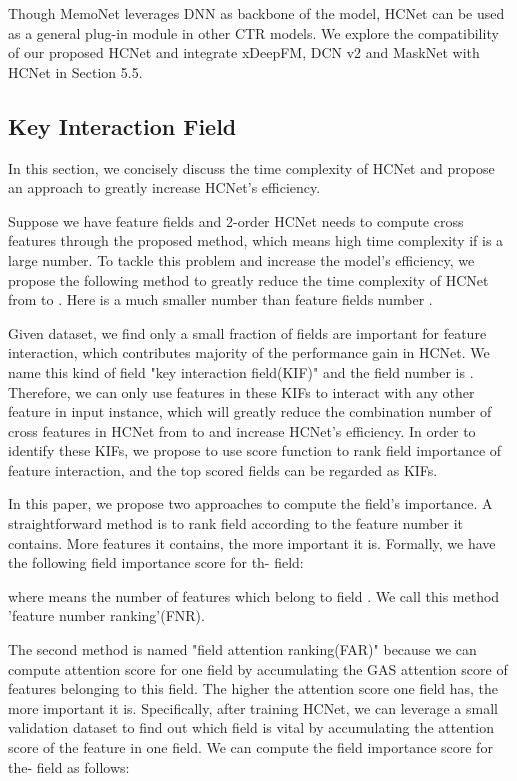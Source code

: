 \documentclass[sigconf,authorversion]{acmart}
\begin{document}
Though MemoNet leverages DNN as backbone of the model, HCNet can be used as a general plug-in module in other CTR models. We explore the compatibility of our proposed HCNet and integrate xDeepFM, DCN v2 and MaskNet with HCNet in Section 5.5.  

\subsection{Key Interaction Field}
In this section, we concisely discuss the time complexity of HCNet and propose an approach to greatly increase HCNet's efficiency.

Suppose we have  feature fields and 2-order HCNet needs to compute  cross features through the proposed method, which means high time complexity if  is a large number. To tackle this problem and increase the model's efficiency, we propose the following method to greatly reduce the time complexity of HCNet from  to . Here   is a much smaller number than feature fields number .  

Given dataset, we find only a small fraction of fields are important for feature interaction, which contributes majority of the performance gain in HCNet. We name this kind of field "key interaction field(KIF)" and the field number is . Therefore, we can only use features in these KIFs to interact with any other feature in input instance, which will greatly reduce the combination number of cross features in HCNet from   to  and increase HCNet's efficiency. In order to identify these KIFs, we propose to use score function    to rank field importance of feature interaction, and the top scored fields can be regarded as KIFs.

In this paper, we propose two approaches to compute the field's importance. A straightforward method is to rank field according to the feature number it contains. More features it contains, the more important it is. Formally, we have the following field importance score for th- field:
 
where  means the number of features which belong to field . We call this method 'feature number ranking'(FNR).

The second method is named "field attention ranking(FAR)" because we can compute attention score for one field by accumulating the GAS attention score of features belonging to this field. The higher the attention score one field has, the more important it is. Specifically, after training HCNet, we can leverage a small validation dataset to find out which field is vital by accumulating the attention score of the feature in one field. We can compute the field importance score  for the- field as follows:
 
\end{document}
